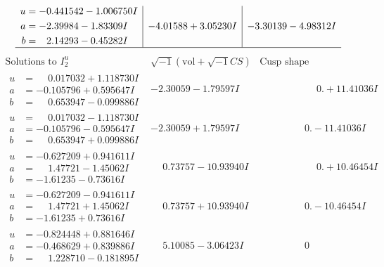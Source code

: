\documentclass[1p]{elsarticle_modified}
\theoremstyle{definition}
\newcommand{\I}{\sqrt{-1}}
\begin{document}
$$\begin{array}{c|c|c}
\begin{aligned}
u &= -0.441542 - 1.006750 I \\
a &= -2.39984 - 1.83309 I \\
b &= \phantom{-}2.14293 - 0.45282 I\end{aligned}
 & -4.01588 + 3.05230 I & -3.30139 - 4.98312 I\\
 \hline 
 \end{array}$$\newpage$$\begin{array}{c|c|c}  
\text{Solutions to }I^u_{2}& \I (\text{vol} + \sqrt{-1}CS) & \text{Cusp shape}\\
 \hline 
\begin{aligned}
u &= \phantom{-}0.017032 + 1.118730 I \\
a &= -0.105796 + 0.595647 I \\
b &= \phantom{-}0.653947 - 0.099886 I\end{aligned}
 & -2.30059 - 1.79597 I & \phantom{-0.000000 -}0. + 11.41036 I \\ \hline\begin{aligned}
u &= \phantom{-}0.017032 - 1.118730 I \\
a &= -0.105796 - 0.595647 I \\
b &= \phantom{-}0.653947 + 0.099886 I\end{aligned}
 & -2.30059 + 1.79597 I & \phantom{-0.000000 } 0. - 11.41036 I \\ \hline\begin{aligned}
u &= -0.627209 + 0.941611 I \\
a &= \phantom{-}1.47721 - 1.45062 I \\
b &= -1.61235 - 0.73616 I\end{aligned}
 & \phantom{-}0.73757 - 10.93940 I & \phantom{-0.000000 -}0. + 10.46454 I \\ \hline\begin{aligned}
u &= -0.627209 - 0.941611 I \\
a &= \phantom{-}1.47721 + 1.45062 I \\
b &= -1.61235 + 0.73616 I\end{aligned}
 & \phantom{-}0.73757 + 10.93940 I & \phantom{-0.000000 } 0. - 10.46454 I \\ \hline\begin{aligned}
u &= -0.824448 + 0.881646 I \\
a &= -0.468629 + 0.839886 I \\
b &= \phantom{-}1.228710 - 0.181895 I\end{aligned}
 & \phantom{-}5.10085 - 3.06423 I & \phantom{-0.000000 } 0 \\ \hline\begin{aligned}

\end{aligned}
\end{array}$$
\end{document}

